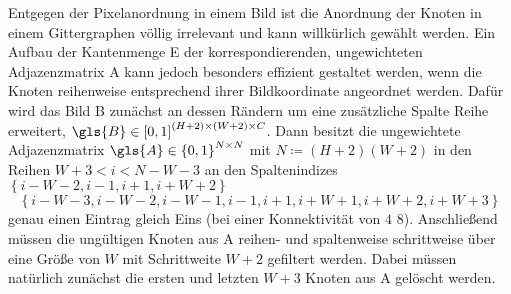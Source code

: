 Entgegen der Pixelanordnung in einem Bild ist die Anordnung der Knoten in einem Gittergraphen völlig irrelevant und kann willkürlich gewählt werden.
Ein Aufbau der Kantenmenge \gls{E} \bzw{} der korrespondierenden, ungewichteten Adjazenzmatrix \gls{A} kann jedoch besonders effizient gestaltet werden, wenn die Knoten reihenweise entsprechend ihrer Bildkoordinate angeordnet werden.
Dafür wird das Bild \gls{B} zunächst an dessen Rändern um eine zusätzliche Spalte \bzw{} Reihe erweitert, \dhe{} $\gls{B} \in {\left[0, 1\right]}^{\left(H + 2\right) \times \left(W + 2\right) \times C}$.
Dann besitzt die ungewichtete Adjazenzmatrix $\gls{A} \in {\left\{0, 1\right\}}^{N \times N}$ mit $N \coloneqq \left(H+2\right)\left(W+2\right)$ in den Reihen $W+3 < i < N - W - 3$ an den Spaltenindizes $\left\{i-W-2, i-1, i+1, i+W+2\right\}$ \bzw{}
\begin{equation*}
  \left\{i-W-3, i-W-2, i-W-1, i-1, i+1, i+W+1, i+W+2, i+W+3\right\}
\end{equation*}
genau einen Eintrag gleich Eins (bei einer Konnektivität von $4$ \bzw{} $8$).
Anschließend müssen die ungültigen Knoten aus \gls{A} reihen- und spaltenweise schrittweise über eine Größe von $W$ mit Schrittweite $W+2$ gefiltert werden.
Dabei müssen natürlich zunächst die ersten und letzten $W + 3$ Knoten aus \gls{A} gelöscht werden.
